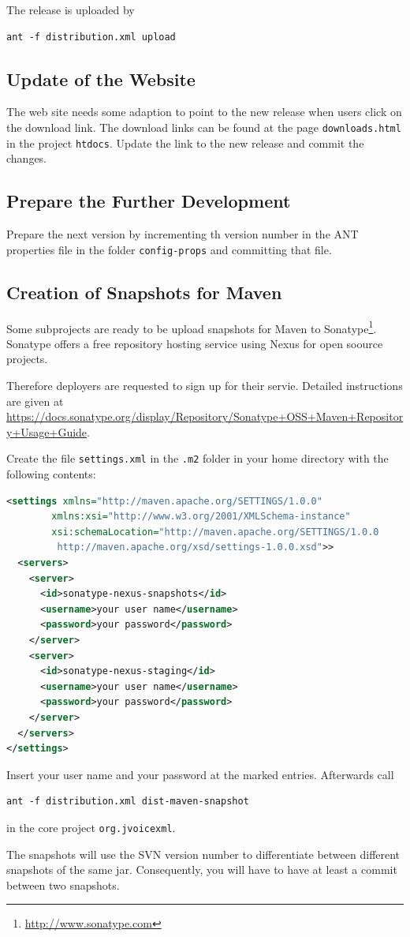 \documentclass[11pt,a4paper]{article}
\begin{document}
The release is uploaded by 
\begin{lstlisting}
ant -f distribution.xml upload
\end{lstlisting}

\subsection{Update of the Website}

The web site needs some adaption to point to the new release when users click
on the download link. The download links can be found at the page
\texttt{downloads.html} in the project \texttt{htdocs}. Update the link
to the new release and commit the changes.

\subsection{Prepare the Further Development}

Prepare the next version by incrementing th version number in the ANT
properties file in the folder \texttt{config-props} and committing that file.

\subsection{Creation of Snapshots for Maven}

Some subprojects are ready to be upload snapshots for Maven to
Sonatype\footnote{\url{http://www.sonatype.com}}. Sonatype offers
a free repository hosting service using Nexus for open soource projects.

Therefore deployers are requested to sign up for their servie. Detailed
instructions are given at \url{https://docs.sonatype.org/display/Repository/Sonatype+OSS+Maven+Repository+Usage+Guide}.

Create the file \texttt{settings.xml} in the \texttt{.m2} folder in your
home directory with the following contents:

\begin{lstlisting}[language=XML]
<settings xmlns="http://maven.apache.org/SETTINGS/1.0.0"
        xmlns:xsi="http://www.w3.org/2001/XMLSchema-instance"
        xsi:schemaLocation="http://maven.apache.org/SETTINGS/1.0.0
         http://maven.apache.org/xsd/settings-1.0.0.xsd">>
  <servers>
    <server>
      <id>sonatype-nexus-snapshots</id>
      <username>your user name</username>
      <password>your password</password>
    </server>
    <server>
      <id>sonatype-nexus-staging</id>
      <username>your user name</username>
      <password>your password</password>
    </server>
  </servers>
</settings>
\end{lstlisting}

Insert your user name and your password at the marked entries.
Afterwards call 
\begin{lstlisting}
ant -f distribution.xml dist-maven-snapshot
\end{lstlisting}
in the core project \lstinline{org.jvoicexml}.

The snapshots will use the SVN version number to differentiate between different
snapshots of the same jar. Consequently, you will have to have at least
a commit between two snapshots.


\end{document}
